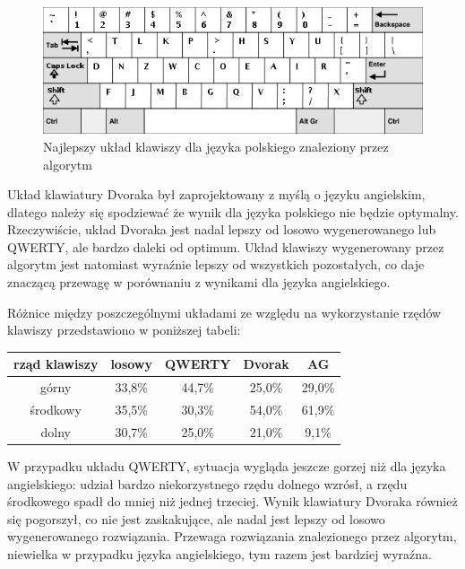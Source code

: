 \documentclass{xmgr}
\begin{document}
\begin{figure}[!tbh]
\centering
\includegraphics[width=.8\hsize]{fig/best_pl}
\caption{Najlepszy układ klawiszy dla języka polskiego znaleziony przez algorytm}
\end{figure}

Układ klawiatury Dvoraka był zaprojektowany z myślą o języku angielskim, dlatego należy się spodziewać że wynik dla języka polskiego nie będzie optymalny. Rzeczywiście, układ Dvoraka jest nadal lepszy od losowo wygenerowanego lub QWERTY, ale bardzo daleki od optimum. Układ klawiszy wygenerowany przez algorytm jest natomiast wyraźnie lepszy od wszystkich pozostałych, co daje znaczącą przewagę w porównaniu z wynikami dla języka angielskiego.

Różnice między poszczególnymi układami ze względu na wykorzystanie rzędów klawiszy przedstawiono w poniższej tabeli:\newline\newline
\begin{tabular}{ c | c | c | c | c}
  rząd klawiszy   & losowy & QWERTY & Dvorak & AG \\
  \hline
  górny           & 33,8\% & 44,7\% & 25,0\% & 29,0\% \\
  środkowy        & 35,5\% & 30,3\% & 54,0\% & 61,9\% \\
  dolny           & 30,7\% & 25,0\% & 21,0\% &  9,1\% \\
\end{tabular}\newline

W przypadku układu QWERTY, sytuacja wygląda jeszcze gorzej niż dla języka angielskiego: udział bardzo niekorzystnego rzędu dolnego wzrósł, a rzędu środkowego spadł do mniej niż jednej trzeciej. Wynik klawiatury Dvoraka również się pogorszył, co nie jest zaskakujące, ale nadal jest lepszy od losowo wygenerowanego rozwiązania. Przewaga rozwiązania znalezionego przez algorytm, niewielka w przypadku języka angielskiego, tym razem jest bardziej wyraźna.
\end{document}
